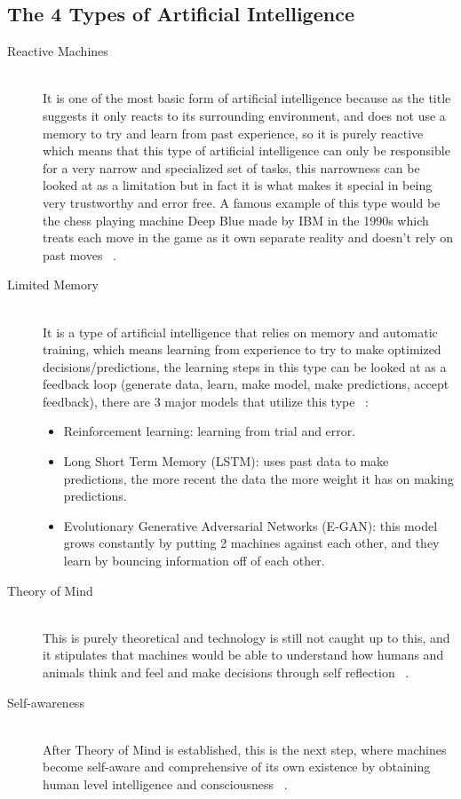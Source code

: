     \subsection{The 4 Types of Artificial Intelligence}
        \begin{description} 
        \item[Reactive Machines] \hfill \\
            It is one of the most basic form of artificial intelligence because as the title suggests it only reacts to its surrounding environment, and does not use a memory to try and learn from past experience, so it is purely reactive which means that this type of artificial intelligence can only be responsible for a very narrow and specialized set of tasks, this narrowness can be looked at as a limitation but in fact it is what makes it special in being very trustworthy and error free. A famous example of this type would be the chess playing machine Deep Blue made by IBM in the 1990s which treats each move in the game as it own separate reality and doesn't rely on past moves ~\cite{ai}.
        \item[Limited Memory] \hfill \\
            It is a type of artificial intelligence that relies on memory and automatic training, which means learning from experience to try to make optimized decisions/predictions, the learning steps in this type can be looked at as a feedback loop (generate data, learn, make model, make predictions, accept feedback), there are 3 major models that utilize this type ~\cite{ai}: 
            \begin{itemize}
                \item Reinforcement learning: learning from trial and error.
                \item Long Short Term Memory (LSTM):  uses past data to make predictions, the more recent the data the more weight it has on making predictions.
                \item Evolutionary Generative Adversarial Networks (E-GAN):  this model grows constantly by putting 2 machines against each other, and they learn by bouncing information off of each other. 
            \end{itemize}
        \item[Theory of Mind] \hfill \\
            This is purely theoretical and technology is still not caught up to this, and it stipulates that machines would be able to understand how humans and animals think and feel and make decisions through self reflection ~\cite{ai}.
        \item[Self-awareness] \hfill \\
            After Theory of Mind is established, this is the next step, where machines become self-aware and comprehensive of its own existence by obtaining human level intelligence and consciousness ~\cite{ai}.
        \end{description}
    
